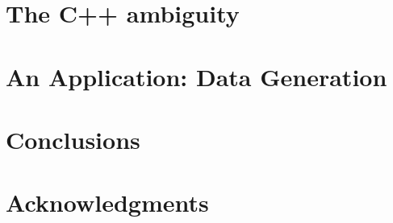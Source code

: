 \documentclass{llncs}
\begin{document}
\section{The C++ ambiguity}
\label{section:c++}


\section{An Application: Data Generation}
\label{section:datageneration}


\section{Conclusions}
\label{section:conclusion}


\section*{Acknowledgments}


\begin{thebibliography}{99}

\end{thebibliography}
\end{document}
